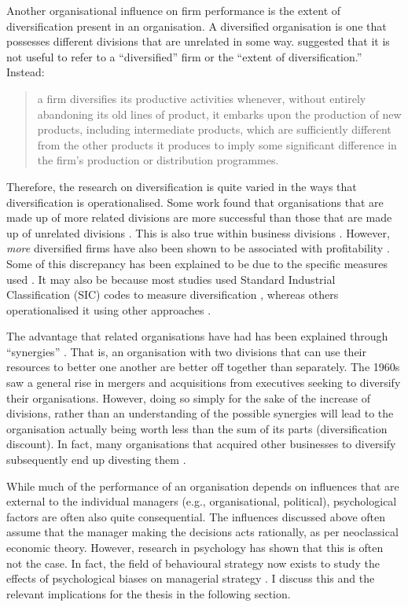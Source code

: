 \documentclass[a4paper, nobind, dvipsnames]{templates/ociamthesis}
\theoremstyle{definition}
\theoremstyle{definition}
\theoremstyle{definition}
\theoremstyle{definition}
\theoremstyle{remark}
\begin{document}
Another organisational influence on firm performance is the extent of
diversification present in an organisation. A diversified organisation is one
that possesses different divisions that are unrelated in some way. \textcite[p.~96]{penrose2009} suggested that it is not useful to refer to a ``diversified'' firm or the
``extent of diversification.'' Instead:

\begin{quote}
a firm diversifies its productive activities whenever, without entirely
abandoning its old lines of product, it embarks upon the production of new
products, including intermediate products, which are sufficiently different
from the other products it produces to imply some significant difference in
the firm's production or distribution programmes.
\end{quote}

Therefore, the research on diversification is quite varied in the ways that
diversification is operationalised. Some work found that organisations that are
made up of more related divisions are more successful than those that are made
up of unrelated divisions \autocite{harrison1993,rumelt1974,shelton1988,wernerfelt1988}. This is also true within business divisions \autocite{davis1992}.
However, \emph{more} diversified firms have also been shown to be associated with
profitability \autocite{grant1988}. Some of this discrepancy has been explained to be
due to the specific measures used \autocite{lubatkin1986}. It may also be because most
studies used Standard Industrial Classification (SIC) codes to measure
diversification \autocite[e.g.,][]{rumelt1974}, whereas others operationalised it using
other approaches \autocite[e.g., resource-based;][]{harrison1993}.

The advantage that related organisations have had has been explained through
``synergies'' \autocite{barney1988}. That is, an organisation with two divisions that can
use their resources to better one another are better off together than
separately. The 1960s saw a general rise in mergers and acquisitions from
executives seeking to diversify their organisations. However, doing so simply
for the sake of the increase of divisions, rather than an understanding of the
possible synergies will lead to the organisation actually being worth less than
the sum of its parts (diversification discount). In fact, many organisations
that acquired other businesses to diversify subsequently end up divesting them
\autocite{porter1987}.

While much of the performance of an organisation depends on influences that are
external to the individual managers (e.g., organisational, political),
psychological factors are often also quite consequential. The influences
discussed above often assume that the manager making the decisions acts
rationally, as per neoclassical economic theory. However, research in psychology
has shown that this is often not the case. In fact, the field of behavioural
strategy now exists to study the effects of psychological biases on managerial
strategy \autocite{powell2011}. I discuss this and the relevant implications for the
thesis in the following section.
\end{document}
